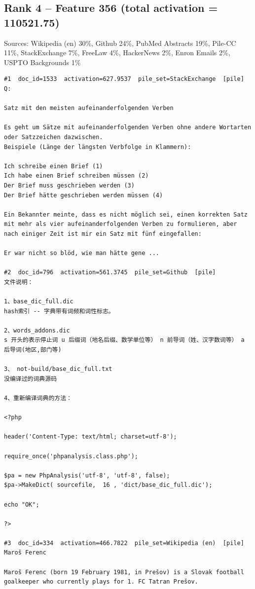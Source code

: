 \subsection*{Rank 4 -- Feature 356 (total activation = 110521.75)}

Sources: Wikipedia (en) 30\%, Github 24\%, PubMed Abstracts 19\%, Pile-CC 11\%, StackExchange 7\%, FreeLaw 4\%, HackerNews 2\%, Enron Emails 2\%, USPTO Backgrounds 1\%

\begin{verbatim}
#1  doc_id=1533  activation=627.9537  pile_set=StackExchange  [pile]
Q:

Satz mit den meisten aufeinanderfolgenden Verben

Es geht um Sätze mit aufeinanderfolgenden Verben ohne andere Wortarten oder Satzzeichen dazwischen.
Beispiele (Länge der längsten Verbfolge in Klammern):

Ich schreibe einen Brief (1)
Ich habe einen Brief schreiben müssen (2)
Der Brief muss geschrieben werden (3)
Der Brief hätte geschrieben werden müssen (4)

Ein Bekannter meinte, dass es nicht möglich sei, einen korrekten Satz mit mehr als vier aufeinanderfolgenden Verben zu formulieren, aber nach einiger Zeit ist mir ein Satz mit fünf eingefallen:

Er war nicht so blöd, wie man hätte gene ...

#2  doc_id=796  activation=561.3745  pile_set=Github  [pile]
﻿文件说明：

1、base_dic_full.dic
hash索引 -- 字典带有词频和词性标志。

2、words_addons.dic
s 开头的表示停止词 u 后缀词（地名后缀、数学单位等） n 前导词（姓、汉字数词等） a 后导词(地区,部门等)

3、 not-build/base_dic_full.txt
没编译过的词典源码

4、重新编译词典的方法：

<?php

header('Content-Type: text/html; charset=utf-8');

require_once('phpanalysis.class.php');

$pa = new PhpAnalysis('utf-8', 'utf-8', false);
$pa->MakeDict( sourcefile,  16 , 'dict/base_dic_full.dic');

echo "OK";

?>

#3  doc_id=334  activation=466.7822  pile_set=Wikipedia (en)  [pile]
Maroš Ferenc

Maroš Ferenc (born 19 February 1981, in Prešov) is a Slovak football goalkeeper who currently plays for 1. FC Tatran Prešov.


\end{verbatim}
